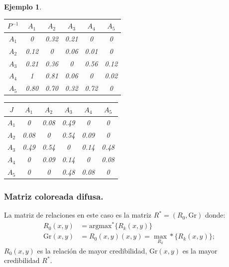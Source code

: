 \documentclass[a5paper,doc,10pt,noapacite]{apa6}
\newtheorem{ejem}{Ejemplo}
\begin{document}
{{\begin{ejem}
\begin{table}[H]
   \fontsize{7}{11}\selectfont
    \begin{minipage}{.5\linewidth}
      \centering
	\begin{tabular}{c|ccccc} \thickline
	\(P^{-1}\) & \(A_1\) & \(A_2\) & \(A_3\) & \(A_4\) & \(A_5\)  \\ \hline
    \(A_1\) & 0 & 0.32 & 0.21 & 0 & 0  \\
    \(A_2\) & 0.12 & 0 & 0.06 & 0.01 & 0  \\
	\(A_3\) & 0.21 & 0.36 & 0 & 0.56 & 0.12   \\
	\(A_4\) & 1 & 0.81 & 0.06 & 0 & 0.02   \\
	\(A_5\) & 0.80 & 0.70 & 0.32 & 0.72 & 0   \\
\end{tabular}
\label{tab:B4} 
    \end{minipage}%
    \begin{minipage}{.5\linewidth}
      \centering
	\begin{tabular}{c|ccccc} \thickline
	\(J\) & \(A_1\) & \(A_2\) & \(A_3\) & \(A_4\) & \(A_5\)  \\ \hline
    \(A_1\) & 0 & 0.08 & 0.49 & 0 & 0  \\
    \(A_2\) & 0.08 & 0 & 0.54 & 0.09 & 0  \\
	\(A_3\) & 0.49 & 0.54 & 0 & 0.14 & 0.48   \\
	\(A_4\) & 0 & 0.09 & 0.14 & 0 & 0.08   \\
	\(A_5\) & 0 & 0 & 0.48 & 0.08 & 0   \\
\end{tabular}
\label{tab:B5} 
    \end{minipage} 
\end{table}
\end{ejem}

\subsubsection{Matriz coloreada difusa.}

La matriz de relaciones en este caso es la matriz \(R^* = (R_0, \text{Gr})\) donde:
\begin{align*}
	R_0(x,y) &= \text{argmax}^*\{R_k(x,y)\}
\\
	\text{Gr}(x,y) &= R_0(x,y)(x,y) =\max_{R_k}*\{R_k(x,y)\};
\end{align*}
\(R_0(x,y)\) es la relación de mayor credibilidad, \(\text{Gr}(x,y)\) es la mayor credibilidad \(R^*\).

}}
\end{document}
